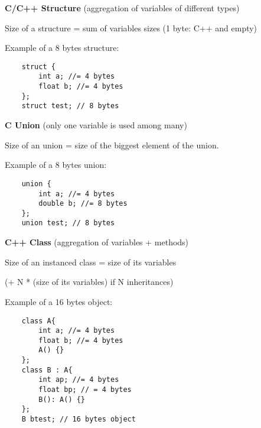 \documentclass[handout]{beamer}[10pt, usepdftitle=false]
\begin{document}
	\begin{frame}[fragile]
	
	\textbf{C/C++ Structure} (aggregation of variables of different types)
	
	Size of a structure = sum of variables sizes (1 byte: C++ and empty)
	
	Example of a 8 bytes structure:
	\begin{verbatim}
	struct {
		int a; //= 4 bytes
		float b; //= 4 bytes
	}; 
	struct test; // 8 bytes
   	\end{verbatim}
   	
   	\textbf{C Union} (only one variable is used among many)
   	
   	Size of an union = size of the biggest element of the union.
   	
   	Example of a 8 bytes union:
   	\begin{verbatim}
	union {
		int a; //= 4 bytes
		double b; //= 8 bytes
	};
	union test; // 8 bytes
   	\end{verbatim}	
	
	\end{frame}
	\begin{frame}[fragile]
	
	\textbf{C++ Class} (aggregation of variables + methods)
	
	Size of an instanced class = size of its variables 
	
	(+ N * (size of its variables) if N inheritances) 
	
	Example of a 16 bytes object:
	\begin{verbatim}
	class A{
		int a; //= 4 bytes
		float b; //= 4 bytes
		A() {}		
	};
	class B : A{
		int ap; //= 4 bytes
		float bp; // = 4 bytes
		B(): A() {}	
	};
	B btest; // 16 bytes object
   	\end{verbatim}
	
	
	\end{frame}
\end{document}
